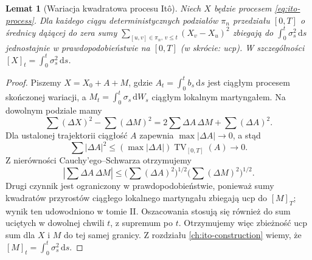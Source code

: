 \documentclass[11pt,a4paper,oneside]{report}
\numberwithin{equation}{chapter}
\theoremstyle{plain}
\newtheorem{lemat}[twierdzenie]{Lemat}
\theoremstyle{definition}
\theoremstyle{remark}
\newcommand{\dd}{\mathrm{d}}
\begin{document}
\begin{lemat}[Wariacja kwadratowa procesu Itô]
\label{lem:ito-qv}
Niech $X$ będzie procesem \eqref{eq:ito-process}. Dla
każdego ciągu deterministycznych podziałów $\pi_n$ przedziału
$[0,T]$ o średnicy dążącej do zera sumy
$\sum_{[u,v]\in\pi_n,\,v\le t}(X_v-X_u)^2$
zbiegają do $\int_0^t\sigma_s^2\,\dd s$ jednostajnie
w prawdopodobieństwie na $[0,T]$ (w skrócie: ucp).
W szczególności $[X]_t=\int_0^t\sigma_s^2\,\dd s$.
\end{lemat}
\begin{proof}
Piszemy $X=X_0+A+M$, gdzie
$A_t=\int_0^tb_s\,\dd s$ jest ciągłym procesem
skończonej wariacji, a $M_t=\int_0^t\sigma_s\,\dd W_s$
ciągłym lokalnym martyngałem. Na dowolnym podziale mamy
\[
\sum(\Delta X)^2-\sum(\Delta M)^2
=2\sum\Delta A\,\Delta M+\sum(\Delta A)^2.
\]
Dla ustalonej trajektorii ciągłość $A$ zapewnia
$\max|\Delta A|\to0$, a stąd
\[
\sum|\Delta A|^2
\le (\max|\Delta A|)\operatorname{TV}_{[0,T]}(A)
\longrightarrow0.
\]
Z nierówności Cauchy'ego--Schwarza otrzymujemy
\[
\left|\sum\Delta A\,\Delta M\right|
\le\Big(\sum(\Delta A)^2\Big)^{1/2}
\Big(\sum(\Delta M)^2\Big)^{1/2}.
\]
Drugi czynnik jest ograniczony w prawdopodobieństwie,
ponieważ sumy kwadratów przyrostów ciągłego lokalnego
martyngału zbiegają ucp do $[M]_T$; wynik ten udowodniono
w tomie II. Oszacowania stosują się również do sum
uciętych w dowolnej chwili $t$, z supremum po $t$.
Otrzymujemy więc zbieżność ucp sum dla $X$ i $M$ do
tej samej granicy. Z rozdziału \ref{ch:ito-construction}
wiemy, że $[M]_t=\int_0^t\sigma_s^2\,\dd s$.
\end{proof}
\end{document}
